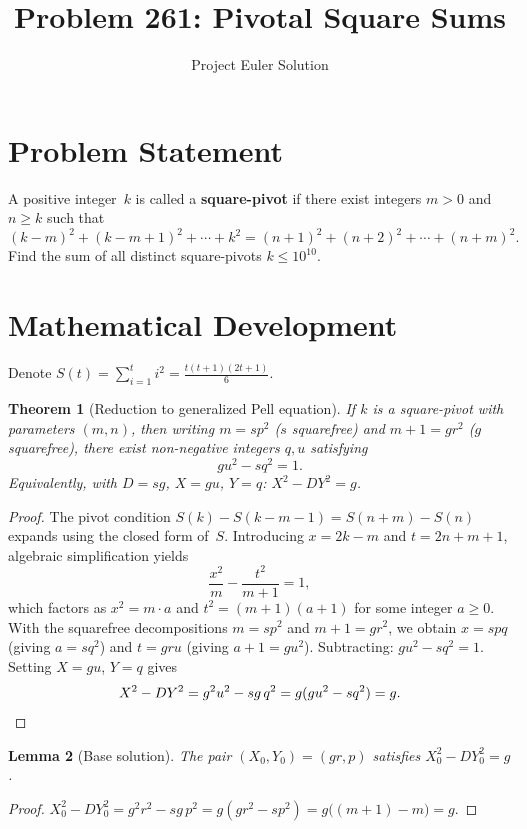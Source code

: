 \documentclass[12pt]{article}
\title{Problem 261: Pivotal Square Sums}
\author{Project Euler Solution}
\date{}
\newtheorem{theorem}{Theorem}
\newtheorem{lemma}[theorem]{Lemma}
\begin{document}
\maketitle

\section{Problem Statement}

A positive integer~$k$ is called a \textbf{square-pivot} if there exist integers $m>0$ and $n\ge k$ such that
\[
(k-m)^2 + (k-m+1)^2 + \cdots + k^2 = (n+1)^2 + (n+2)^2 + \cdots + (n+m)^2.
\]
Find the sum of all distinct square-pivots $k \le 10^{10}$.

\section{Mathematical Development}

Denote $S(t) = \sum_{i=1}^{t} i^2 = \tfrac{t(t+1)(2t+1)}{6}$.

\begin{theorem}[Reduction to generalized Pell equation]
\label{thm:pell}
If $k$ is a square-pivot with parameters $(m,n)$, then writing $m = sp^2$ ($s$ squarefree) and $m+1 = gr^2$ ($g$ squarefree), there exist non-negative integers $q,u$ satisfying
\[
gu^2 - sq^2 = 1.
\]
Equivalently, with $D = sg$, $X = gu$, $Y = q$: $X^2 - DY^2 = g$.
\end{theorem}

\begin{proof}
The pivot condition $S(k) - S(k-m-1) = S(n+m) - S(n)$ expands using the closed form of~$S$. Introducing $x = 2k - m$ and $t = 2n + m + 1$, algebraic simplification yields
\[
\frac{x^2}{m} - \frac{t^2}{m+1} = 1,
\]
which factors as $x^2 = m\cdot a$ and $t^2 = (m+1)(a+1)$ for some integer $a \ge 0$. With the squarefree decompositions $m = sp^2$ and $m+1 = gr^2$, we obtain $x = spq$ (giving $a = sq^2$) and $t = gru$ (giving $a+1 = gu^2$). Subtracting: $gu^2 - sq^2 = 1$. Setting $X = gu$, $Y = q$ gives
\[
X^2 - DY^2 = g^2u^2 - sg\,q^2 = g(gu^2 - sq^2) = g. \qedhere
\]
\end{proof}

\begin{lemma}[Base solution]
\label{lem:base}
The pair $(X_0, Y_0) = (gr, p)$ satisfies $X_0^2 - DY_0^2 = g$.
\end{lemma}

\begin{proof}
$X_0^2 - DY_0^2 = g^2r^2 - sg\,p^2 = g(gr^2 - sp^2) = g\bigl((m+1) - m\bigr) = g$.
\end{proof}
\end{document}
